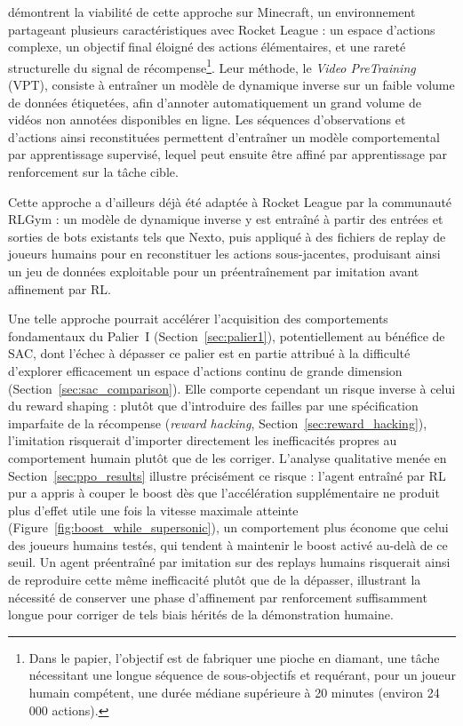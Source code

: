 \textcite{bakerVideoPreTrainingVPT2022} démontrent la viabilité de cette approche sur Minecraft, un environnement partageant plusieurs caractéristiques avec Rocket League : un espace d'actions complexe, un objectif final éloigné des actions élémentaires, et une rareté structurelle du signal de récompense\footnote{Dans le papier, l'objectif est de fabriquer une pioche en diamant, une tâche nécessitant une longue séquence de sous-objectifs et requérant, pour un joueur humain compétent, une durée médiane supérieure à 20 minutes (environ 24\,000 actions).}. Leur méthode, le \textit{Video PreTraining} (VPT), consiste à entraîner un modèle de dynamique inverse sur un faible volume de données étiquetées, afin d'annoter automatiquement un grand volume de vidéos non annotées disponibles en ligne. Les séquences d'observations et d'actions ainsi reconstituées permettent d'entraîner un modèle comportemental par apprentissage supervisé, lequel peut ensuite être affiné par apprentissage par renforcement sur la tâche cible.

Cette approche a d'ailleurs déjà été adaptée à Rocket League par la communauté RLGym \parencite{rolv-arildRolvArildReplaypretraining2026} : un modèle de dynamique inverse y est entraîné à partir des entrées et sorties de bots existants tels que Nexto, puis appliqué à des fichiers de replay de joueurs humains pour en reconstituer les actions sous-jacentes, produisant ainsi un jeu de données exploitable pour un préentraînement par imitation avant affinement par RL.

Une telle approche pourrait accélérer l'acquisition des comportements fondamentaux du Palier~I (Section~\ref{sec:palier1}), potentiellement au bénéfice de SAC, dont l'échec à dépasser ce palier est en partie attribué à la difficulté d'explorer efficacement un espace d'actions continu de grande dimension (Section~\ref{sec:sac_comparison}). Elle comporte cependant un risque inverse à celui du reward shaping : plutôt que d'introduire des failles par une spécification imparfaite de la récompense (\textit{reward hacking}, Section~\ref{sec:reward_hacking}), l'imitation risquerait d'importer directement les inefficacités propres au comportement humain plutôt que de les corriger. L'analyse qualitative menée en Section~\ref{sec:ppo_results} illustre précisément ce risque : l'agent entraîné par RL pur a appris à couper le boost dès que l'accélération supplémentaire ne produit plus d'effet utile une fois la vitesse maximale atteinte (Figure~\ref{fig:boost_while_supersonic}), un comportement plus économe que celui des joueurs humains testés, qui tendent à maintenir le boost activé au-delà de ce seuil. Un agent préentraîné par imitation sur des replays humains risquerait ainsi de reproduire cette même inefficacité plutôt que de la dépasser, illustrant la nécessité de conserver une phase d'affinement par renforcement suffisamment longue pour corriger de tels biais hérités de la démonstration humaine.

